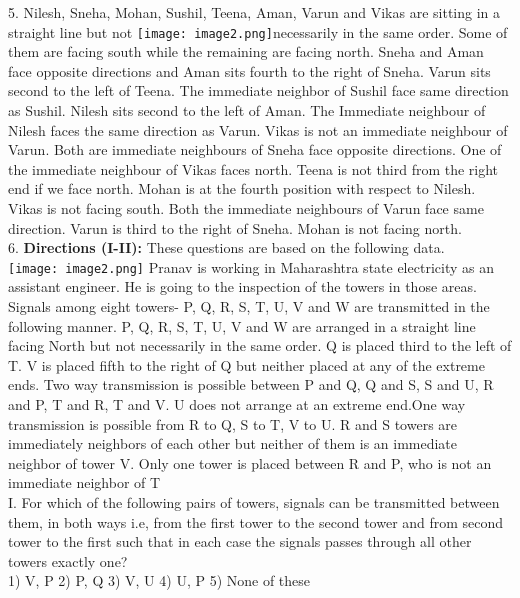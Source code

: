 \documentclass[
]{article}
\begin{document}
5. Nilesh, Sneha, Mohan, Sushil, Teena, Aman, Varun and Vikas are sitting in a straight line
but not \texttt{[image: image2.png]}necessarily in the same order. Some of them are facing south while the remaining
are facing north. Sneha and Aman face opposite directions and Aman sits fourth to the right
of Sneha. Varun sits second to the left of Teena. The immediate neighbor of Sushil face same
direction as Sushil. Nilesh sits second to the left of Aman. The Immediate neighbour of
Nilesh faces the same direction as Varun. Vikas is not an immediate neighbour of Varun.
Both are immediate neighbours of Sneha face opposite directions. One of the immediate
neighbour of Vikas faces north. Teena is not third from the right end if we face north.
Mohan is at the fourth position with respect to Nilesh. Vikas is not facing south. Both the
immediate neighbours of Varun face same direction. Varun is third to the right of Sneha.
Mohan is not facing north.\\

6. \textbf{Directions (I-II):} These questions are based on the following data.\\
\texttt{[image: image2.png]}
Pranav is working in Maharashtra state electricity as an assistant engineer. He is going to
the inspection of the towers in those areas. Signals among eight towers- P, Q, R, S, T, U, V
and W are transmitted in the following manner. P, Q, R, S, T, U, V and W are arranged in a
straight line facing North but not necessarily in the same order. Q is placed third to the left
of T. V is placed fifth to the right of Q but neither placed at any of the extreme ends. Two
way transmission is possible between P and Q, Q and S, S and U, R and P, T and R, T and V.
U does not arrange at an extreme end.One way transmission is possible from R to Q, S to T,
V to U. R and S towers are immediately neighbors of each other but neither of them is an
immediate neighbor of tower V. Only one tower is placed between R and P, who is not an
immediate neighbor of T\\

I. For which of the following pairs of towers, signals can be transmitted between them, in
both ways i.e, from the first tower to the second tower and from second tower to the first
such that in each case the signals passes through all other towers exactly one?\\
1) V, P \hspace{2mm}2) P, Q \hspace{2mm}3) V, U \hspace{2mm}4) U, P \hspace{2mm}5) None of these\\
\end{document}
